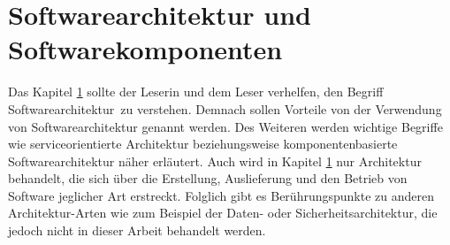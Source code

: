 \section{Softwarearchitektur und Softwarekomponenten}
\label{sec:2_Architektur}
Das Kapitel \ref{sec:2_Architektur} sollte der Leserin und dem Leser verhelfen, den Begriff \glqq Softwarearchitektur\grqq\ zu verstehen. Demnach sollen Vorteile von der Verwendung von Softwarearchitektur genannt werden. Des Weiteren werden wichtige Begriffe wie serviceorientierte Architektur beziehungsweise komponentenbasierte Softwarearchitektur näher erläutert.
Auch wird in Kapitel \ref{sec:2_Architektur} nur Architektur behandelt, die sich über die Erstellung, Auslieferung und den Betrieb von Software jeglicher Art erstreckt. Folglich gibt es Berührungspunkte zu anderen Architektur-Arten wie zum Beispiel der Daten- oder Sicherheitsarchitektur, die jedoch nicht in dieser Arbeit behandelt werden.






